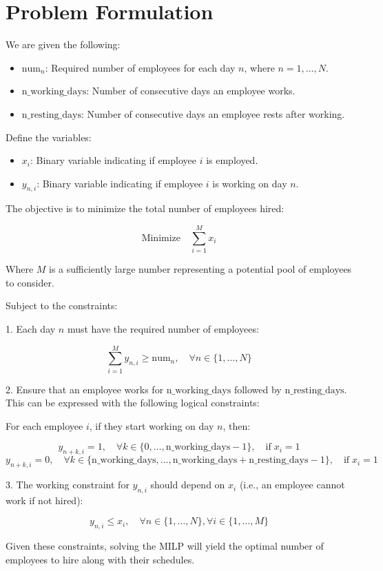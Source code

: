 \documentclass{article}
\begin{document}
\section*{Problem Formulation}

We are given the following:

\begin{itemize}
    \item \(\text{num}_n\): Required number of employees for each day \(n\), where \(n = 1, \ldots, N\).
    \item \(\text{n\_working\_days}\): Number of consecutive days an employee works.
    \item \(\text{n\_resting\_days}\): Number of consecutive days an employee rests after working.
\end{itemize}

Define the variables:

\begin{itemize}
    \item \(x_i\): Binary variable indicating if employee \(i\) is employed.
    \item \(y_{n,i}\): Binary variable indicating if employee \(i\) is working on day \(n\).
\end{itemize}

The objective is to minimize the total number of employees hired:

\[
\text{Minimize} \quad \sum_{i=1}^{M} x_i
\]

Where \(M\) is a sufficiently large number representing a potential pool of employees to consider.

Subject to the constraints:

1. Each day \(n\) must have the required number of employees:

\[
\sum_{i=1}^{M} y_{n,i} \geq \text{num}_n, \quad \forall n \in \{1, \ldots, N\}
\]

2. Ensure that an employee works for \(\text{n\_working\_days}\) followed by \(\text{n\_resting\_days}\). This can be expressed with the following logical constraints:

For each employee \(i\), if they start working on day \(n\), then:

\[
y_{n+k,i} = 1, \quad \forall k \in \{0, \ldots, \text{n\_working\_days} - 1\}, \quad \text{if}\; x_i = 1
\]
\[
y_{n+k,i} = 0, \quad \forall k \in \{\text{n\_working\_days}, \ldots, \text{n\_working\_days} + \text{n\_resting\_days} - 1\}, \quad \text{if}\; x_i = 1
\]

3. The working constraint for \(y_{n,i}\) should depend on \(x_i\) (i.e., an employee cannot work if not hired):

\[
y_{n,i} \leq x_i, \quad \forall n \in \{1, \ldots, N\}, \forall i \in \{1, \ldots, M\}
\]

Given these constraints, solving the MILP will yield the optimal number of employees to hire along with their schedules.
\end{document}
